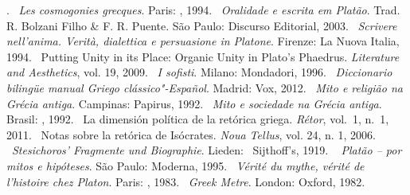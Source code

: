 \begin{bibliohedra}
  .
~\emph{Les cosmogonies grecques}. Paris: , 1994.
~\emph{Oralidade e escrita em Platão}. Trad. R. Bolzani
  Filho \& F. R. Puente. São Paulo: Discurso Editorial, 2003.
~\emph{Scrivere nell'anima. Verità, dialettica e
  persuasione in Platone}. Firenze: La Nuova Italia, 1994.
~Putting Unity in its Place: Organic Unity in
  Plato's Phaedrus. \emph{Literature and Aesthetics}, vol. 19, 2009.
~\emph{I sofisti}. Milano: Mondadori, 1996.
~\emph{Diccionario bilingüe manual Griego clássico"-Español}. Madrid: Vox, 2012.
~\emph{Mito e religião na Grécia antiga}. Campinas:
  Papirus, 1992.
~\emph{Mito e sociedade na Grécia antiga}. Brasil: ,
  1992.
~La dimensión política de la retórica griega.
  \emph{Rétor}, vol.~1, n.~1, 2011.
~Notas sobre la retórica de Isócrates. \emph{Noua Tellus},
  vol. 24, n. 1, 2006.
~\emph{Stesichoros' Fragmente und Biographie}. Lieden:
  ~Sijthoff's, 1919.
~\emph{ Platão -- por mitos e hipóteses}. São Paulo:
  Moderna, 1995.
~\emph{Vérité du mythe, vérité de l'histoire chez
  Platon}. Paris: , 1983.
~\emph{Greek Metre}. London: Oxford, 1982.
\end{bibliohedra}
